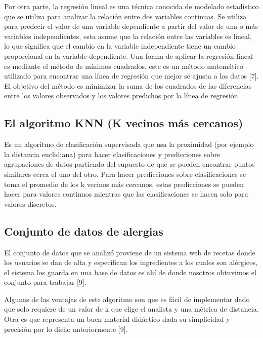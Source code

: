 \documentclass[
]{article}
\begin{document}
Por otra parte, la regresión lineal es una técnica conocida de modelado
estadístico que se utiliza para analizar la relación entre dos variables
continuas. Se utiliza para predecir el valor de una variable dependiente
a partir del valor de una o más variables independientes, esta asume que
la relación entre las variables es lineal, lo que significa que el
cambio en la variable independiente tiene un cambio proporcional en la
variable dependiente. Una forma de aplicar la regresión lineal es
mediante el método de mínimos cuadrados, este es un método matemático
utilizado para encontrar una línea de regresión que mejor se ajusta a
los datos {[}7{]}. El objetivo del método es minimizar la suma de los
cuadrados de las diferencias entre los valores observados y los valores
predichos por la línea de regresión.

\hypertarget{el-algoritmo-knn-k-vecinos-muxe1s-cercanos}{%
\subsection{El algoritmo KNN (K vecinos más
cercanos)}\label{el-algoritmo-knn-k-vecinos-muxe1s-cercanos}}

Es un algoritmo de clasificación supervisada que usa la proximidad (por
ejemplo la distancia euclidiana) para hacer clasificaciones y
predicciones sobre agrupaciones de datos partiendo del supuesto de que
se pueden encontrar puntos similares cerca el uno del otro. Para hacer
predicciones sobre clasificaciones se toma el promedio de los k vecinos
más cercanos, estas predicciones se pueden hacer para valores continuos
mientras que las clasificaciones se hacen solo para valores discretos.

\hypertarget{conjunto-de-datos-de-alergias}{%
\subsection{Conjunto de datos de
alergias}\label{conjunto-de-datos-de-alergias}}

El conjunto de datos que se analizó proviene de un sistema web de
recetas donde los usuarios se dan de alta y especifican los ingredientes
a los cuales son alérgicos, el sistema los guarda en una base de datos
es ahí de donde nosotros obtuvimos el conjunto para trabajar {[}9{]}.

Algunas de las ventajas de este algoritmo son que es fácil de
implementar dado que solo requiere de un valor de k que elige el
analista y una métrica de distancia. Otra es que representa un buen
material didáctico dada su simplicidad y precisión por lo dicho
anteriormente {[}9{]}.
\end{document}
